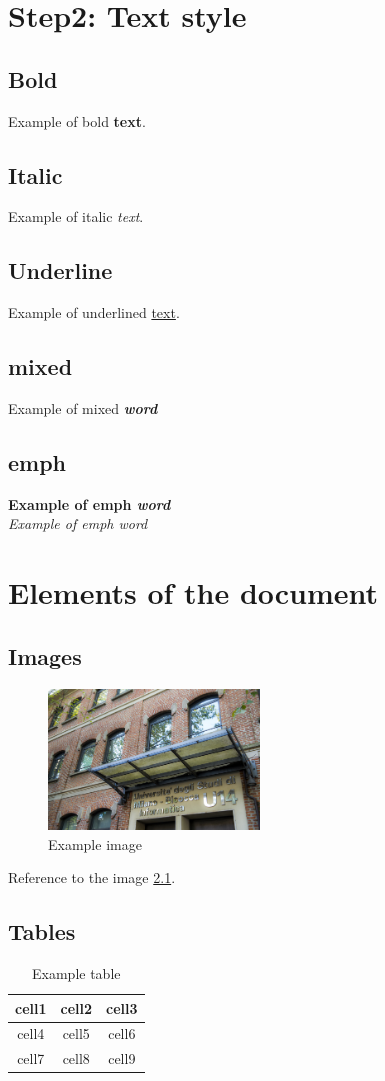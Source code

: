 \documentclass[a4paper, oneside]{book}
\begin{document}
\chapter{Step2: Text style}
\section{Bold}
Example of bold \textbf{text}.
\section{Italic}
Example of italic \textit{text}.
\section{Underline}
Example of underlined \underline{text}.
\section{mixed}
Example of mixed \textbf{\textit{word}}
\section{emph}
\textbf{Example of emph \emph{word}}\\
\textit{Example of emph \emph{word}}

\chapter{Elements of the document}
\section{Images}


\begin{figure}[H]
\centering
\includegraphics[width=0.5\textwidth]{u14.jpg}
\caption{Example image}
\label{img:ref_image}
\end{figure}

Reference to the image \ref{img:ref_image}.

\section{Tables}
\begin{table}
\centering
\begin{tabular}{|c|c|c|} 
 \hline
 cell1 & cell2 & cell3 \\ \hline
 cell4 & cell5 & cell6 \\ \hline
 cell7 & cell8 & cell9 \\ \hline
\end{tabular}
\caption{Example table}
\label{tab:ref_table}
\end{table}
\end{document}
